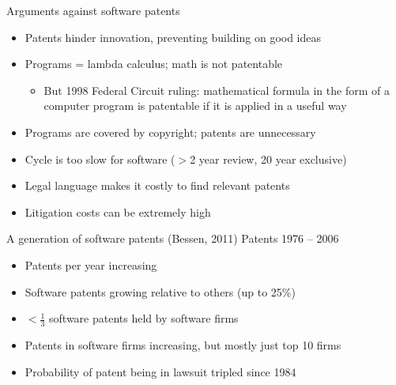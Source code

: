 \documentclass{beamer}
\begin{document}
\begin{frame}{Arguments against software patents}
\begin{itemize}
\item Patents hinder innovation, preventing building on good ideas
\item Programs = lambda calculus; math is not patentable
\begin{itemize}
\item But 1998 Federal Circuit ruling: mathematical formula in the form of a 
computer program is patentable if it is applied in a useful way
\end{itemize}
\item Programs are covered by copyright; patents are unnecessary
\item Cycle is too slow for software ($>$2 year review, 20 year exclusive)
\item Legal language makes it costly to find relevant patents
\item Litigation costs can be extremely high
\end{itemize}
\end{frame}

\begin{frame}{A generation of software patents (Bessen, 2011)}
Patents 1976 -- 2006
\begin{itemize}
\item Patents per year increasing
\item Software patents growing relative to others (up to 25\%)
\item $<$$\frac{1}{3}$ software patents held by software firms
\item Patents in software firms increasing, but mostly just top 10 firms
\item Probability of patent being in lawsuit tripled since 1984
\end{itemize}
\end{frame}
\end{document}

